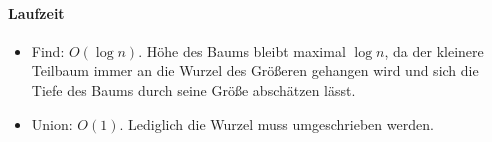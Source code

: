     \paragraph{Laufzeit}
    \begin{itemize}
        \item[] Find: $ O(\log n) $. Höhe des Baums bleibt maximal $ \log n $, da der kleinere Teilbaum immer an die Wurzel des Größeren gehangen wird und sich die Tiefe des Baums durch seine Größe abschätzen lässt.
        \item[] Union: $ O(1) $. Lediglich die Wurzel muss umgeschrieben werden.
    \end{itemize}
    
    
    
    
    
    
    
    
    

